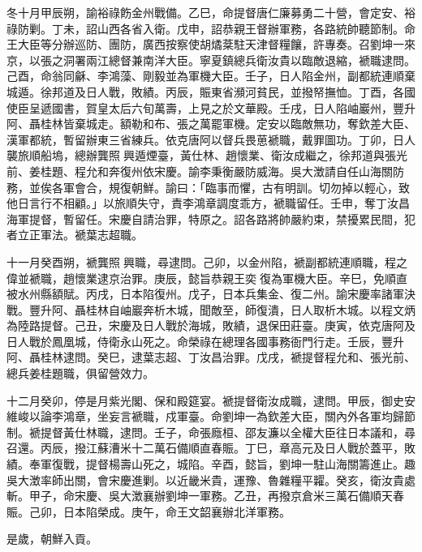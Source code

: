 \begin{pinyinscope}
冬十月甲辰朔，諭裕祿飭金州戰備。乙巳，命提督唐仁廉募勇二十營，會定安、裕祿防剿。丁未，詔山西各省入衛。戊申，詔恭親王督辦軍務，各路統帥聽節制。命王大臣等分辦巡防、團防，廣西按察使胡燏棻駐天津督糧饟，許專奏。召劉坤一來京，以張之洞署兩江總督兼南洋大臣。寧夏鎮總兵衛汝貴以臨敵退縮，褫職逮問。己酉，命翁同龢、李鴻藻、剛毅並為軍機大臣。壬子，日人陷金州，副都統連順棄城遁。徐邦道及日人戰，敗績。丙辰，賑東省瀕河貧民，並撥帑撫恤。丁酉，各國使臣呈遞國書，賀皇太后六旬萬壽，上見之於文華殿。壬戌，日人陷岫巖州，豐升阿、聶桂林皆棄城走。額勒和布、張之萬罷軍機。定安以臨敵無功，奪欽差大臣、漢軍都統，暫留辦東三省練兵。依克唐阿以督兵畏葸褫職，戴罪圖功。丁卯，日人襲旅順船塢，總辦龔照興遁煙臺，黃仕林、趙懷業、衛汝成繼之，徐邦道與張光前、姜桂題、程允和奔復州依宋慶。諭李秉衡嚴防威海。吳大澂請自任山海關防務，並俟各軍會合，規復朝鮮。諭曰：「臨事而懼，古有明訓。切勿掉以輕心，致他日言行不相顧。」以旅順失守，責李鴻章調度乖方，褫職留任。壬申，奪丁汝昌海軍提督，暫留任。宋慶自請治罪，特原之。詔各路將帥嚴約束，禁擾累民間，犯者立正軍法。褫葉志超職。

十一月癸酉朔，褫龔照興職，尋逮問。己卯，以金州陷，褫副都統連順職，程之偉並褫職，趙懷業逮京治罪。庚辰，懿旨恭親王奕復為軍機大臣。辛巳，免順直被水州縣額賦。丙戌，日本陷復州。戊子，日本兵集金、復二州。諭宋慶率諸軍決戰。豐升阿、聶桂林自岫巖奔析木城，聞敵至，師復潰，日人取析木城。以程文炳為陸路提督。己丑，宋慶及日人戰於海城，敗績，退保田莊臺。庚寅，依克唐阿及日人戰於鳳凰城，侍衛永山死之。命榮祿在總理各國事務衙門行走。壬辰，豐升阿、聶桂林逮問。癸巳，逮葉志超、丁汝昌治罪。戊戌，褫提督程允和、張光前、總兵姜桂題職，俱留營效力。

十二月癸卯，停是月紫光閣、保和殿筵宴。褫提督衛汝成職，逮問。甲辰，御史安維峻以論李鴻章，坐妄言褫職，戍軍臺。命劉坤一為欽差大臣，關內外各軍均歸節制。褫提督黃仕林職，逮問。壬子，命張廕桓、邵友濂以全權大臣往日本議和，尋召還。丙辰，撥江蘇漕米十二萬石備順直春賑。丁巳，章高元及日人戰於蓋平，敗績。奉軍復戰，提督楊壽山死之，城陷。辛酉，懿旨，劉坤一駐山海關籌進止。趣吳大澂率師出關，會宋慶進剿。以近畿米貴，運豫、魯雜糧平糶。癸亥，衛汝貴處斬。甲子，命宋慶、吳大澂襄辦劉坤一軍務。乙丑，再撥京倉米三萬石備順天春賑。己卯，日本陷榮成。庚午，命王文韶襄辦北洋軍務。

是歲，朝鮮入貢。


\end{pinyinscope}